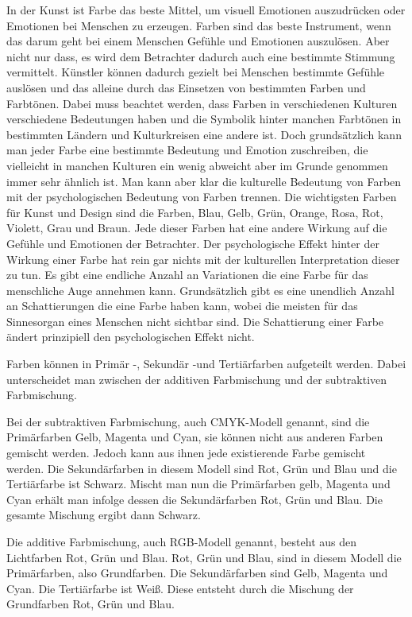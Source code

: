 In der Kunst ist Farbe das beste Mittel, um visuell Emotionen auszudrücken oder Emotionen bei Menschen zu erzeugen. Farben sind das beste Instrument, wenn das darum geht bei einem Menschen Gefühle und Emotionen auszulösen. Aber nicht nur dass, es wird dem Betrachter dadurch auch eine bestimmte Stimmung vermittelt. Künstler können dadurch gezielt bei Menschen bestimmte Gefühle auslösen und das alleine durch das Einsetzen von bestimmten Farben und Farbtönen. 
Dabei muss beachtet werden, dass Farben in verschiedenen Kulturen verschiedene Bedeutungen haben und die Symbolik hinter manchen Farbtönen in bestimmten Ländern und Kulturkreisen eine andere ist. Doch grundsätzlich kann man jeder Farbe eine bestimmte Bedeutung und Emotion zuschreiben, die vielleicht in manchen Kulturen ein wenig abweicht aber im Grunde genommen immer sehr ähnlich ist. 
Man kann aber klar die kulturelle Bedeutung von Farben mit der psychologischen Bedeutung von Farben trennen. Die wichtigsten Farben für Kunst und Design sind die Farben, Blau, Gelb, Grün, Orange, Rosa, Rot, Violett, Grau und Braun. Jede dieser Farben hat eine andere Wirkung auf die Gefühle und Emotionen der Betrachter. Der psychologische Effekt hinter der Wirkung einer Farbe hat rein gar nichts mit der kulturellen Interpretation dieser zu tun. 
Es gibt eine endliche Anzahl an Variationen die eine Farbe für das menschliche Auge annehmen kann. Grundsätzlich gibt es eine unendlich Anzahl an Schattierungen die eine Farbe haben kann, wobei die meisten für das Sinnesorgan eines Menschen nicht sichtbar sind. Die Schattierung einer Farbe ändert prinzipiell den psychologischen Effekt nicht. 

Farben können in Primär -, Sekundär -und Tertiärfarben aufgeteilt werden. Dabei unterscheidet man zwischen der additiven Farbmischung und der subtraktiven Farbmischung. 

Bei der subtraktiven Farbmischung, auch CMYK-Modell genannt, sind die Primärfarben Gelb, Magenta und Cyan, sie können nicht aus anderen Farben gemischt werden. Jedoch kann aus ihnen jede existierende Farbe gemischt werden. Die Sekundärfarben in diesem Modell sind Rot, Grün und Blau und die Tertiärfarbe ist Schwarz. Mischt man nun die Primärfarben gelb, Magenta und Cyan erhält man infolge dessen die Sekundärfarben Rot, Grün und Blau. Die gesamte Mischung ergibt dann Schwarz. 



Die additive Farbmischung, auch RGB-Modell genannt, besteht aus den Lichtfarben Rot, Grün und Blau. Rot, Grün und Blau, sind in diesem Modell die Primärfarben, also Grundfarben. Die Sekundärfarben sind Gelb, Magenta und Cyan. Die Tertiärfarbe ist Weiß. Diese entsteht durch die Mischung der Grundfarben Rot, Grün und Blau. 

